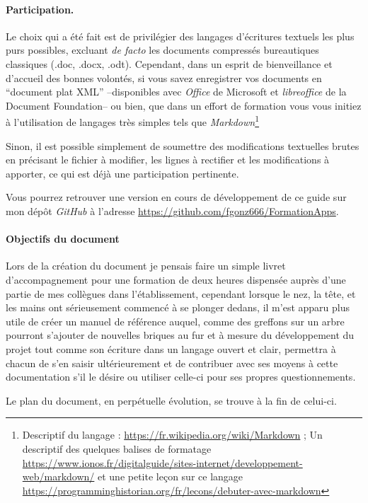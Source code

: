 \paragraph{Participation.}
Le choix qui a été fait est de privilégier des langages d'écritures textuels les plus purs possibles, excluant \emph{de facto\/} les documents compressés bureautiques classiques (.doc, .docx, .odt). 
Cependant, dans un esprit de bienveillance et d'accueil des bonnes volontés, si vous savez enregistrer vos documents en ``document plat XML'' --disponibles avec \emph{Office} de Microsoft et \emph{libreoffice} de la Document Foundation-- ou bien, que dans un effort de formation vous vous initiez à l'utilisation de langages très simples tels que \emph{Markdown}\footnote{%
Descriptif du langage : \url{https://fr.wikipedia.org/wiki/Markdown} ; Un descriptif des quelques balises de formatage \url{https://www.ionos.fr/digitalguide/sites-internet/developpement-web/markdown/} et une petite leçon sur ce langage \url{https://programminghistorian.org/fr/lecons/debuter-avec-markdown}
}

Sinon, il est possible simplement de soumettre des modifications textuelles brutes en précisant le fichier à modifier, les lignes à rectifier et les modifications à apporter, ce qui est déjà une participation pertinente.

Vous pourrez retrouver une version en cours de développement de ce guide sur mon dépôt \emph{GitHub} à l'adresse \url{https://github.com/fgonz666/FormationApps}.

\paragraph{Objectifs du document} 
Lors de la création du document je pensais faire un simple livret d'accompagnement pour une formation de deux heures dispensée auprès d'une partie de mes collègues dans l'établissement, cependant lorsque le nez, la tête, et les mains ont sérieusement commencé à se plonger dedans, il m'est apparu plus utile de créer un manuel de référence auquel, comme des greffons sur un arbre pourront s'ajouter de nouvelles briques au fur et à mesure du développement du projet tout comme son écriture dans un langage ouvert et clair, permettra à chacun de s'en saisir ultérieurement et de contribuer avec ses moyens à cette documentation s'il le désire ou utiliser celle-ci pour ses propres questionnements.

%
Le plan du document, en perpétuelle évolution, se trouve à la fin de celui-ci.